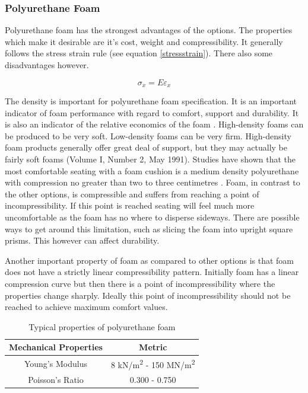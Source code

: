 \documentclass[conference]{IEEEtran}
\begin{document}
        \subsubsection{Polyurethane Foam}
        Polyurethane foam has the strongest advantages of the options. The properties which make it desirable are it's cost, weight and compressibility. It generally follows the stress strain rule (see equation \ref{stressstrain}). There also some disadvantages however.
        
        \begin{equation}
        \label{stressstrain}
        \sigma_{x} = E\varepsilon_{x}
        \end{equation}

The density is important for polyurethane foam specification. It is an important indicator of foam performance with regard to comfort, support and durability. It is also an indicator of the relative economics of the foam \cite{PolyurethaneFoamAssociation1991}. High-density foams can be produced to be very soft. Low-density foams can be very firm. High-density foam products generally offer great deal of support, but they may actually be fairly soft foams (Volume I, Number 2, May 1991). Studies have shown that the most comfortable seating with a foam cushion is a medium density polyurethane with compression no greater than two to three centimetres \cite{drury1982}. Foam, in contrast to the other options, is compressible and suffers from reaching a point of incompressibility. If this point is reached seating will feel much more uncomfortable \cite{Nigel2002} as the foam has no where to disperse sideways. There are possible ways to get around this limitation, such as slicing the foam into upright square prisms. This however can affect durability.

Another important property of foam as compared to other options is that foam does not have a strictly linear compressibility pattern. Initially foam has a linear compression curve but then there is a point of incompressibility where the properties change sharply. Ideally this point of incompressibility should not be reached to achieve maximum comfort values.

\begin{table}[!t]
    \centering
    \caption{Typical properties of polyurethane foam \cite{Patel2008}}
    \label{properties}
    \begin{tabular}{c c}
    \hline
    Mechanical Properties         	& Metric 				\\ \hline \hline
    Young's Modulus                   	& 8 kN/m\textsuperscript{2}  - 150 MN/m\textsuperscript{2}	 \\ \hline
    Poisson's Ratio                    	& 0.300 - 0.750         		\\ 
    \end{tabular}
\end{table}
\end{document}
